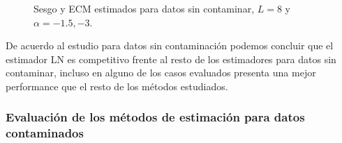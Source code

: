 \begin{figure}[htb]
	\caption{\label{SesgoyECMSinContL=8,-1.5y-3}\small Sesgo y ECM estimados para datos sin contaminar, $ L=8$ y $\alpha=-1.5, -3$.}
\end{figure}

De acuerdo al estudio para datos sin contaminación podemos concluir que el estimador LN es competitivo frente al resto de los estimadores para datos sin contaminar, incluso en alguno de los casos evaluados presenta una mejor performance que el resto de los métodos estudiados.

\subsubsection{Evaluación de los métodos de estimación para datos contaminados}

